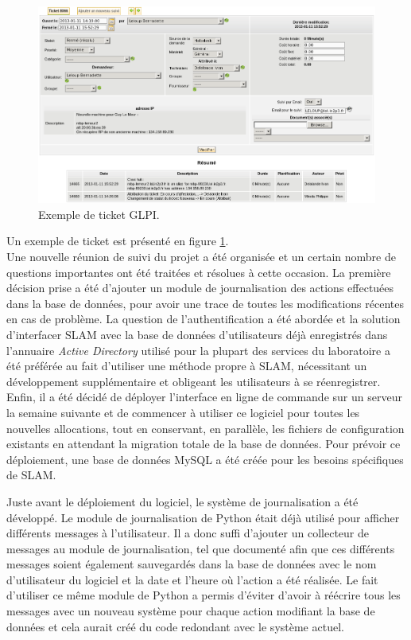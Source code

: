 \documentclass[12pt,a4paper,twoside]{report}
\begin{document}
\begin{figure}[hbt]
	\includegraphics[scale=0.45]{img/glpi2.png}
	\caption{Exemple de ticket GLPI.}
	\label{fig:glpi2}
\end{figure}

Un exemple de ticket est présenté en figure \ref{fig:glpi2}.\\

Une nouvelle réunion de suivi du projet a été organisée et un certain nombre de
questions importantes ont été traitées et résolues à cette occasion. La
première décision prise a été d’ajouter un module de journalisation des
actions effectuées dans la base de données, pour avoir une trace de toutes les
modifications récentes en cas de problème. La question de l’authentification a
été abordée et la solution d’interfacer SLAM avec la base de données
d’utilisateurs déjà enregistrés dans l’annuaire \emph{Active Directory} utilisé
pour la plupart des services du laboratoire a été préférée au fait d’utiliser
une méthode propre à SLAM, nécessitant un développement supplémentaire et
obligeant les utilisateurs à se réenregistrer. Enfin, il a été décidé de
déployer l’interface en ligne de commande sur un serveur la semaine suivante et
de commencer à utiliser ce logiciel pour toutes les nouvelles allocations, tout
en conservant, en parallèle, les fichiers de configuration existants en
attendant la migration totale de la base de données.  Pour prévoir ce
déploiement, une base de données MySQL a été créée pour les besoins spécifiques
de SLAM.

Juste avant le déploiement du logiciel, le système de journalisation a été
développé. Le module de journalisation de Python était déjà utilisé pour
afficher différents messages à l’utilisateur. Il a donc suffi d’ajouter un
collecteur de messages au module de journalisation, tel que documenté afin que
ces différents messages soient également sauvegardés dans la base de données
avec le nom d’utilisateur du logiciel et la date et l’heure où l’action a été
réalisée. Le fait d’utiliser ce même module de Python a permis d’éviter d’avoir
à réécrire tous les messages avec un nouveau système pour chaque action
modifiant la base de données et cela aurait créé du code redondant avec le
système actuel.\\
\end{document}
